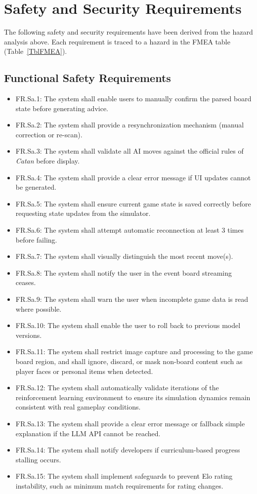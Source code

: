 \documentclass{article}
\begin{document}
\section{Safety and Security Requirements}\label{sec:safety-and-security-requirements}


The following safety and security requirements have been derived from the hazard analysis above.
Each requirement is traced to a hazard in the FMEA table (Table~\ref{TblFMEA}). \newline

\subsection{Functional Safety Requirements}
\begin{itemize}
    \item FR.Sa.1: The system shall enable users to manually confirm the parsed board state before generating advice.
    \item FR.Sa.2: The system shall provide a resynchronization mechanism (manual correction or re-scan).
    \item FR.Sa.3: The system shall validate all AI moves against the official rules of \emph{Catan} before display.
    \item FR.Sa.4: The system shall provide a clear error message if UI updates cannot be generated.
    \item FR.Sa.5: The system shall ensure current game state is saved correctly before requesting state updates from the simulator.
    \item FR.Sa.6: The system shall attempt automatic reconnection at least 3 times before failing.
    \item FR.Sa.7: The system shall visually distinguish the most recent move(s).
    \item FR.Sa.8: The system shall notify the user in the event board streaming ceases.
    \item FR.Sa.9: The system shall warn the user when incomplete game data is read where possible.
    \item FR.Sa.10: The system shall enable the user to roll back to previous model versions.
    \item FR.Sa.11: The system shall restrict image capture and processing to the game board region, and shall ignore, discard, or mask non-board content such as player faces or personal items when detected.
    \item FR.Sa.12: The system shall automatically validate iterations of the reinforcement learning environment to ensure its simulation dynamics remain consistent with real gameplay conditions.
    \item FR.Sa.13: The system shall provide a clear error message or fallback simple explanation if the LLM API cannot be reached.
    \item FR.Sa.14: The system shall notify developers if curriculum-based progress stalling occurs.
    \item FR.Sa.15: The system shall implement safeguards to prevent Elo rating instability, such as minimum match requirements for rating changes. \newline
\end{itemize}
\end{document}
